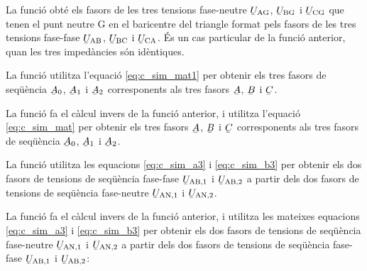 


La funció  obté els fasors de les tres tensions fase-neutre $\cmplx{U}\ped{AG}$, $\cmplx{U}\ped{BG}$ i $\cmplx{U}\ped{CG}$ que tenen el punt neutre G en el baricentre del triangle format pels fasors de  les tres tensions fase-fase
$\cmplx{U}\ped{AB}$, $\cmplx{U}\ped{BC}$ i $\cmplx{U}\ped{CA}$. És un cas particular de la funció anterior, quan les tres impedàncies són idèntiques.




La funció  utilitza l'equació \eqref{eq:c_sim_mat1} per obtenir els tres fasors de seqüència
$\cmplx{A}_0$, $\cmplx{A}_1$ i  $\cmplx{A}_2$ corresponents als tres fasors $\cmplx{A}$, $\cmplx{B}$ i $\cmplx{C}$.




La funció  fa el càlcul  invers de la funció anterior, i utilitza l'equació \eqref{eq:c_sim_mat} per obtenir els tres fasors
$\cmplx{A}$, $\cmplx{B}$ i $\cmplx{C}$  corresponents als tres fasors de seqüència
$\cmplx{A}_0$, $\cmplx{A}_1$ i  $\cmplx{A}_2$.




La funció  utilitza les equacions  \eqref{eq:c_sim_a3} i \eqref{eq:c_sim_b3} per obtenir els dos fasors de tensions de seqüència fase-fase $\cmplx{U}\ped{AB,1}$ i  $\cmplx{U}\ped{AB,2}$ a partir dels dos fasors de tensions de seqüència fase-neutre $\cmplx{U}\ped{AN,1}$ i $\cmplx{U}\ped{AN,2}$.




La funció  fa el càlcul invers de la funció anterior, i utilitza les mateixes equacions  \eqref{eq:c_sim_a3} i \eqref{eq:c_sim_b3} per obtenir els dos fasors de tensions de seqüència fase-neutre $\cmplx{U}\ped{AN,1}$ i $\cmplx{U}\ped{AN,2}$ a partir dels dos fasors de tensions de seqüència fase-fase $\cmplx{U}\ped{AB,1}$ i  $\cmplx{U}\ped{AB,2}$:

